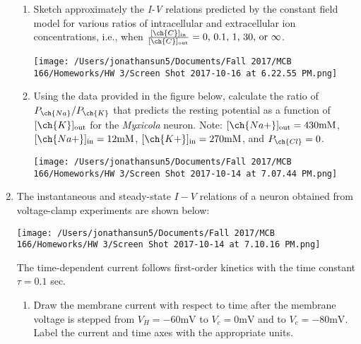 \documentclass[11pt]{article}
\begin{document}
\begin{enumerate}[label=\arabic*.]
\begin{enumerate}[label=(\alph*)]
\item
Sketch approximately the \textit{I-V} relations predicted by the constant field model for various ratios of intracellular and extracellular ion concentrations, i.e., when $\frac{[\ch{C}]_{\text{in}}} {[\ch{C}]_{\text{out}}} = 0\text{, } 0.1\text{, } 1\text{, } 30\text{, or } \infty$.
\begin{center}
\texttt{[image: /Users/jonathansun5/Documents/Fall 2017/MCB 166/Homeworks/HW 3/Screen Shot 2017-10-16 at 6.22.55 PM.png]}
\end{center}



\item
Using the data provided in the figure below, calculate the ratio of $P_{\ch{Na}} / P_{\ch{K}}$ that predicts the resting potential as a function of $[\ch{K}]_{\text{out}}$ for the \textit{Myxicola} neuron. Note: $[\ch{Na+}]_{\text{out}} = 430 \text{mM}$, $[\ch{Na+}]_{\text{in}} = 12 \text{mM}$, $[\ch{K+}]_{\text{in}} = 270 \text{mM}$, and $P_{\ch{Cl}} = 0$.
\begin{center}
\texttt{[image: /Users/jonathansun5/Documents/Fall 2017/MCB 166/Homeworks/HW 3/Screen Shot 2017-10-14 at 7.07.44 PM.png]}
\end{center}



\end{enumerate}













\newpage
\item
The instantaneous and steady-state $I-V$ relations of a neuron obtained from voltage-clamp experiments are shown below:
\begin{center}
\texttt{[image: /Users/jonathansun5/Documents/Fall 2017/MCB 166/Homeworks/HW 3/Screen Shot 2017-10-14 at 7.10.16 PM.png]}
\end{center}
The time-dependent current follows first-order kinetics with the time constant $\tau = 0.1$ sec.
\begin{enumerate}[label=(\alph*)]
\item
Draw the membrane current with respect to time after the membrane voltage is stepped from $V_H = -60 \text{mV}$ to $V_c = 0 \text{mV}$ and to $V_c = -80 \text{mV}$. Label the current and time axes with the appropriate units.







\end{enumerate}
\end{enumerate}
\end{document}
